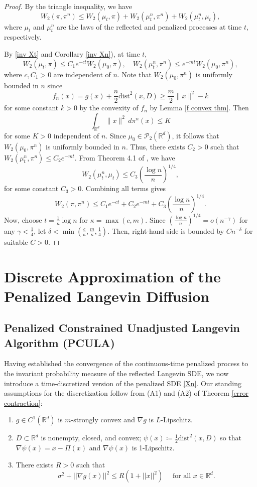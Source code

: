 \documentclass[amsfonts, reqno]{amsart}
\theoremstyle{definition}
\theoremstyle{remark}
\newcommand{\bbR}{\mathbb{R}}
\newcommand{\dist}{\text{dist}}
\numberwithin{equation}{section}
\begin{document}
\begin{proof}
By the triangle inequality, we have
\[
W_2(\pi, \pi^n) \leq W_2(\mu_t, \pi) + W_2(\mu_t^n, \pi^n) + W_2(\mu_t^n, \mu_t),
\]
where $\mu_t$ and $\mu_t^n$ are the laws of the reflected and penalized processes at time $t$, respectively. 

By \eqref{inv Xt} and Corollary \ref{inv Xn}), at time $t$,
\[
W_2(\mu_t, \pi) \leq C_1 e^{-ct} W_2(\mu_0, \pi), \quad W_2(\mu_t^n, \pi^n) \leq e^{-mt} W_2(\mu_0, \pi^n),
\]
where $c, C_1 > 0$ are independent of $n$. Note that $W_2(\mu_0, \pi^n)$ is uniformly bounded in $n$ since \[ f_n(x) = g(x) + \frac{n}{2}\text{dist}^2(x, D) \geq \frac{m}{2}\|x\|^2 - k\] for some constant $ k > 0 $ by the convexity of $f_n$ by Lemma \ref{f convex thm}. Then
\[
\int_{\mathbb{R}^d} \|x\|^2 \, d\pi^n(x) \leq K
\]
for some $K > 0 $ independent of $n$. Since $ \mu_0 \in \mathcal{P}_2(\mathbb{R}^d) $, it follows that $ W_2(\mu_0, \pi^n) $ is uniformly bounded in $n$. Thus, there exists $C_2 > 0$ such that $W_2(\mu_t^n, \pi^n) \leq C_2e^{-mt}.$ From Theorem 4.1 of \cite{slominski2013}, we have
\[
W_2(\mu_t^n, \mu_t) \leq C_3 \left( \frac{\log n}{n} \right)^{1/4},
\]
for some constant $C_3 > 0$. Combining all terms gives
\[
W_2(\pi, \pi^n) \leq C_1 e^{-ct} + C_2 e^{-mt} + C_3 \left( \frac{\log n}{n} \right)^{1/4}.
\]
Now, choose $t = \frac{1}{\kappa} \log n$ for $\kappa = \max(c, m)$. Since $\left( \frac{\log n}{n} \right)^{1/4} = o(n^{-\gamma})$ for any $\gamma < \frac{1}{4}$, let $\delta < \min\left( \frac{c}{\kappa}, \frac{m}{\kappa}, \frac{1}{4}\right)$. Then, right-hand side is bounded by $C n^{-\delta}$ for suitable $C > 0$.
\end{proof}

\section{Discrete Approximation of the Penalized Langevin Diffusion}
\subsection{Penalized Constrained Unadjusted Langevin Algorithm (PCULA)}

Having established the convergence of the continuous-time penalized process to the invariant probability measure of the reflected Langevin SDE, we now introduce a time-discretized version of the penalized SDE \eqref{Xn}. Our standing assumptions for the discretization follow from (A1) and (A2) of Theorem \ref{error contraction}: 
\begin{enumerate}
    \item[(EM1)] $g \in C^1(\bbR^d)$ is $m$-strongly convex and $\nabla g$ is $L$-Lipschitz.
    \item[(EM2)] $D \subset \bbR^d$ is nonempty, closed, and convex; $\psi(x) \coloneqq \frac{1}{2}\dist^2(x, D)$ so that $\nabla\psi(x) = x - \Pi(x)$ and $\nabla\psi(x)$ is 1-Lipschitz.
    \item[(EM3)] There exists $R > 0$ such that \[
        \sigma^2 + ||\nabla g(x)||^2 \leq R(1 + ||x||^2) \quad \text{ for all } x \in \bbR^d.\]
\end{enumerate} 
\end{document}
